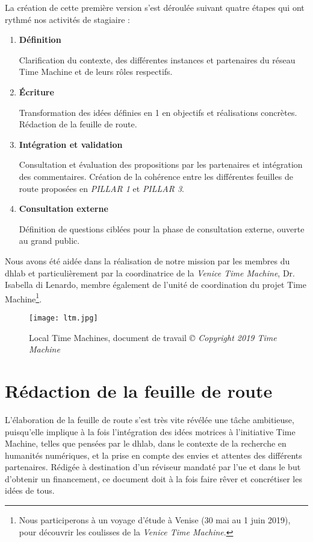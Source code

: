 La création de cette première version s'est déroulée suivant quatre étapes qui ont rythmé nos activités de stagiaire : 

\begin{enumerate}
\item \textbf{Définition}

Clarification du contexte, des différentes instances et partenaires du réseau Time Machine et de leurs rôles respectifs.
\item \textbf{Écriture}

Transformation des idées définies en 1 en objectifs et réalisations concrètes. Rédaction de la feuille de route.
\item \textbf{Intégration et validation}

Consultation et évaluation des propositions par les partenaires et intégration des commentaires. Création de la cohérence entre les différentes feuilles de route proposées en \textit{PILLAR 1} et \textit{PILLAR 3}. 
\item \textbf{Consultation externe}

Définition de questions ciblées pour la phase de consultation externe, ouverte au grand public.
\end{enumerate}

Nous avons été aidée dans la réalisation de notre mission par les membres du \gls{dhlab} et particulièrement par la coordinatrice de la \textit{Venice Time Machine}, Dr. Isabella di Lenardo, membre également de l'unité de coordination du projet Time Machine\footnote{Nous participerons à un voyage d'étude à Venise (30 mai au 1 juin 2019), pour découvrir les coulisses de la \textit{Venice Time Machine}.}.
\newpage

\begin{figure}[H]%
\texttt{[image: ltm.jpg]}
\caption{Local Time Machines, document de travail \textit{© Copyright 2019 Time Machine}}
\end{figure}


\section{Rédaction de la feuille de route}

L'élaboration de la feuille de route s'est très vite révélée une tâche ambitieuse, puisqu'elle implique à la fois l'intégration des idées motrices à l'initiative Time Machine, telles que pensées par le \gls{dhlab}, dans le contexte de la recherche en humanités numériques, et la prise en compte des envies et attentes des différents partenaires. Rédigée à destination d'un réviseur mandaté par l'\gls{ue} et dans le but d'obtenir un financement, ce document doit à la fois faire rêver et concrétiser les idées de tous. 

